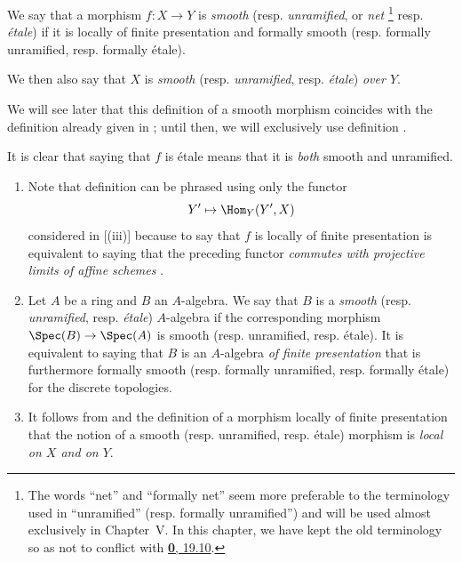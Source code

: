 \begin{definition}[17.3.1]
\label{IV.17.3.1}
We say that a morphism $f:X\to Y$ is \emph{smooth} (resp. \emph{unramified}, or \emph{net}
\footnote{The words ``net'' and ``formally net'' seem more preferable to the terminology used in ``unramified'' (resp. formally unramified'') and will be used almost exclusively in Chapter~V.
In this chapter, we have kept the old terminology so as not to conflict with \hyperref[subsection:IV.19.10]{\textbf{0}, 19.10}.}
resp. \emph{\'etale})
if it is locally of finite presentation and formally smooth (resp. formally unramified, resp. formally \'etale).
\end{definition}

We then also say that $X$ is \emph{smooth} (resp. \emph{unramified}, resp. \emph{\'etale}) \emph{over $Y$}.

We will see later  that this definition of a smooth morphism coincides with the definition already given in ;
until then, we will exclusively use definition .

It is clear that saying that $f$ is \'etale means that it is \emph{both} smooth and unramified.

\begin{remark}[17.3.2]
\label{IV.17.3.2}
\medskip\noindent
\begin{enumerate}
  \item[(i)] Note that definition  can be phrased using only the functor
    \[
      Y'\mapsto\Hom_Y(Y',X)
    \]
    considered in [(iii)] because to say that $f$ is locally of finite presentation is equivalent to saying that the preceding functor \emph{commutes with projective limits of affine schemes} .
  \item[(ii)] Let $A$ be a ring and $B$ an $A$-algebra. 
   We say that $B$ is a \emph{smooth} (resp. \emph{unramified}, resp. \emph{\'etale}) $A$-algebra if the corresponding morphism $\Spec(B)\to\Spec(A)$ is smooth (resp. unramified, resp. \'etale).
   It is equivalent to saying that $B$ is an $A$-algebra \emph{of finite presentation}  that is furthermore formally smooth (resp. formally unramified, resp. formally \'etale) for the discrete topologies.
  \item[(iii)] It follows from  and the definition of a morphism locally of finite presentation  that the notion of a smooth (resp. unramified, resp. \'etale) morphism is \emph{local on $X$ and on $Y$}.
\end{enumerate}
\end{remark}

